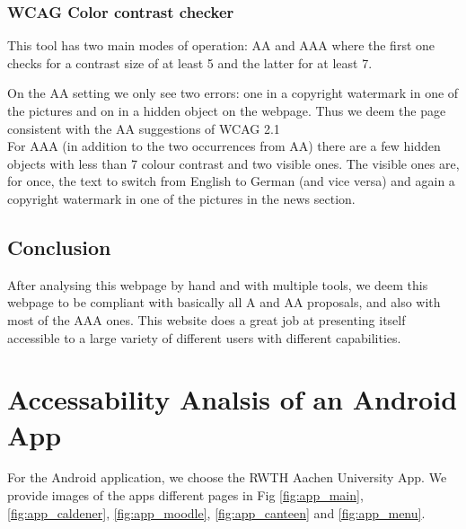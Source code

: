 \subsection*{WCAG Color contrast checker}
This tool has two main modes of operation: AA and AAA where the first one checks for a contrast size of at least 5 and the latter for at least 7.

On the AA setting we only see two errors: one in a copyright watermark in one of the pictures and on in a hidden object on the webpage. Thus we deem the page consistent with the AA suggestions of WCAG 2.1\\
For AAA (in addition to the two occurrences from AA) there are a few hidden objects with less than 7 colour contrast and two visible ones. The visible ones are, for once, the text to switch from English to German (and vice versa) and again a copyright watermark in one of the pictures in the news section.

\section{Conclusion}
After analysing this webpage by hand and with multiple tools, we deem this webpage to be compliant with basically all A and AA proposals, and also with most of the AAA ones. This website does a great job at presenting itself accessible to a large variety of different users with different capabilities.

\chapter{Accessability Analsis of an Android App}
For the Android application, we choose the RWTH Aachen University App. We provide images of the apps different pages in Fig \ref{fig:app_main}, \ref{fig:app_caldener}, \ref{fig:app_moodle}, \ref{fig:app_canteen} and \ref{fig:app_menu}.

